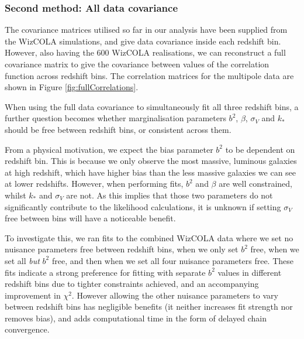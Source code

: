 \documentclass[iop,twocolappendix]{emulateapj}
\begin{document}
\subsubsection{Second method: All data covariance} \label{sec:allData}

The covariance matrices utilised so far in our analysis have been supplied from the WizCOLA simulations, and give data covariance inside each redshift bin. However, also having the 600 WizCOLA realisations, we can reconstruct a full covariance matrix to give the covariance between values of the correlation function across redshift bins. The correlation matrices for the multipole data are shown in Figure \ref{fig:fullCorrelations}.




When using the full data covariance to simultaneously fit all three redshift bins, a further question becomes whether marginalisation parameters $b^2$, $\beta$, $\sigma_V$ and $k_*$ should be free between redshift bins, or consistent across them. 

From a physical motivation, we expect the bias parameter $b^2$ to be dependent on redshift bin. This is because we only observe the most massive, luminous galaxies at high redshift, which have higher bias than the less massive galaxies we can see at lower redshifts. However, when performing fits, $b^2$ and $\beta$ are well constrained, whilst $k_*$ and $\sigma_V$ are not. As this implies that those two parameters do not significantly contribute to the likelihood calculations, it is unknown if setting $\sigma_V$ free between bins will have a noticeable benefit. 


To investigate this, we ran fits to the combined WizCOLA data where we set no nuisance parameters free between redshift bins, when we only set $b^2$ free, when we set all \textit{but} $b^2$ free, and then when we set all four nuisance parameters free.  These fits indicate a strong preference for fitting with separate $b^2$ values in different redshift bins due to tighter constraints achieved, and an accompanying improvement in $\chi^2$.  However allowing the other nuisance parameters to vary between redshift bins has negligible benefits (it neither increases fit strength nor removes  bias), and adds computational time in the form of delayed chain convergence.
\end{document}
